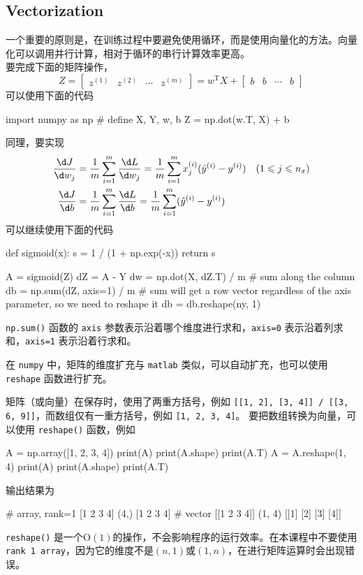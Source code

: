 \subsection{Vectorization}

一个重要的原则是，在训练过程中要避免使用循环，而是使用向量化的方法。向量化可以调用并行计算，相对于循环的串行计算效率更高。\\
要完成下面的矩阵操作，
\begin{equation}
    Z =
    \begin{bmatrix}
        z^{(1)} & z^{(2)} & \cdots & z^{(m)}
    \end{bmatrix}
    = w^\mathrm{T} X + 
    \begin{bmatrix}
        b & b & \cdots & b
    \end{bmatrix}
\end{equation}
可以使用下面的代码
\begin{python}
import numpy as np
# define X, Y, w, b
Z = np.dot(w.T, X) + b
\end{python}
同理，要实现
\begin{equation}
    \begin{aligned}
        \frac{\d J}{\d w_j} &= \frac{1}{m} \sum_{i=1}^{m} \frac{\d L}{\d w_j} = \frac{1}{m} \sum_{i=1}^{m} x_j^{(i)} (\hat{y}^{(i)} - y^{(i)}) \quad (1 \leqslant j \leqslant n_x)\\
        \frac{\d J}{\d b} &= \frac{1}{m} \sum_{i=1}^{m} \frac{\d L}{\d b} = \frac{1}{m} \sum_{i=1}^{m} (\hat{y}^{(i)} - y^{(i)})
    \end{aligned}
\end{equation}
可以继续使用下面的代码
\begin{python}
def sigmoid(x):
    s = 1 / (1 + np.exp(-x))
    return s


A = sigmoid(Z)
dZ = A - Y
dw = np.dot(X, dZ.T) / m
# sum along the column
db = np.sum(dZ, axis=1) / m
# sum will get a row vector regardless of the axis parameter, so we need to reshape it
db = db.reshape(ny, 1)
\end{python}
\verb|np.sum()| 函数的 \verb|axis| 参数表示沿着哪个维度进行求和，\verb|axis=0| 表示沿着列求和，\verb|axis=1| 表示沿着行求和。

在 \verb|numpy| 中，矩阵的维度扩充与 \verb|matlab| 类似，可以自动扩充，也可以使用 \verb|reshape| 函数进行扩充。

矩阵（或向量）在保存时，使用了两重方括号，例如 \verb|[[1, 2], [3, 4]] / [[3, 6, 9]]|，而数组仅有一重方括号，例如 \verb|[1, 2, 3, 4]|。
要把数组转换为向量，可以使用 \verb|reshape()| 函数，例如
\begin{python}
A = np.array([1, 2, 3, 4])
print(A)
print(A.shape)
print(A.T)
A = A.reshape(1, 4)
print(A)
print(A.shape)
print(A.T)
\end{python}
输出结果为
\begin{python}
# array, rank=1
[1 2 3 4]
(4,) 
[1 2 3 4]
# vector
[[1 2 3 4]]
(1, 4) 
[[1]
 [2]
 [3]
 [4]]
\end{python}
\verb|reshape()| 是一个$\mathrm{O}(1)$的操作，不会影响程序的运行效率。在本课程中不要使用 \verb|rank 1 array|，因为它的维度不是$(n, 1)$或$(1, n)$，在进行矩阵运算时会出现错误。

